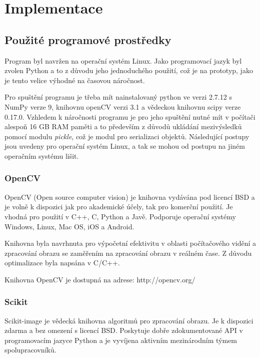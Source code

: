 \documentclass[czech,BP]{thesiskiv}
\begin{document}
\chapter{Implementace}
\section{Použité programové prostředky}
\par Program byl navržen na operační systém Linux. Jako programovací jazyk byl zvolen Python a to z důvodu jeho jednoduchého použití, což je na prototyp, jako je tento velice výhodné na časovou náročnost. 

\par Pro spuštění programu je třeba mít nainstalovaný python ve verzi 2.7.12 s NumPy verze 9, knihovnu openCV verzi 3.1 a vědeckou knihovnu scipy verze 0.17.0. Vzhledem k náročnosti programu je pro jeho spuštění nutné mít v počítači alespoň 16 GB RAM paměti a to především z důvodů ukládání mezivýsledků pomocí modulu \textit{pickle}, což je modul pro serializaci objektů. Následující postupy jsou uvedeny pro operační systém Linux, a tak se mohou od postupu na jiném operačním systému lišit.   
  
  
\subsection{OpenCV}
\par OpenCV (Open source computer vision) je knihovna vydávána pod licencí BSD a je volně k dispozici jak pro akademické účely, tak pro komerční použití. Je vhodná pro použití v C++, C, Python a Javě. Podporuje operační systémy Windows, Linux, Mac OS, iOS a Android.

\par Knihovna byla navrhnuta pro výpočetní efektivitu v oblasti počítačového vidění a zpracování obrazu se zaměřením na zpracování obrazu v reálném čase. Z důvodu optimalizace byla napsána v C/C++. 

\par Knihovna OpenCV je dostupná na adrese: http://opencv.org/

\subsection{Scikit}
\par Scikit-image je vědecká knihovna algoritmů pro zpracování obrazu. Je k dispozici zdarma a bez omezení s licencí BSD. Poskytuje dobře zdokumentované API v programovacím jazyce Python a je vyvíjena aktivním mezinárodním týmem spolupracovníků.
\cite{Scikit}
\end{document}
